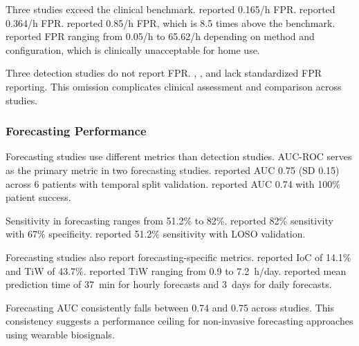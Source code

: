 Three studies exceed the clinical benchmark. \textcite{dongTwoLayerEnsembleMethod2022} reported 0.165/h FPR. \textcite{wangEpilepticSeizureDetection2025} reported 0.364/h FPR. \textcite{odeDevelopmentEpilepticSeizure2023} reported 0.85/h FPR, which is 8.5 times above the benchmark. \textcite{reintjesECGBasedDetectionEpileptic2025} reported FPR ranging from 0.05/h to 65.62/h depending on method and configuration, which is clinically unacceptable for home use.

Three detection studies do not report FPR. \textcite{singhrathoreDevelopmentMultimodalMachine2024}, \textcite{elemamAutomatedValidatedTool2025}, and \textcite{borujenyDetectionEpilepticSeizure2013} lack standardized FPR reporting. This omission complicates clinical assessment and comparison across studies.

\subsubsection{Forecasting Performance}

Forecasting studies use different metrics than detection studies. AUC-ROC serves as the primary metric in two forecasting studies. \textcite{nasseriAmbulatorySeizureForecasting2021} reported AUC 0.75 (SD 0.15) across 6 patients with temporal split validation. \textcite{stirlingForecastingSeizureLikelihood2021} reported AUC 0.74 with 100\% patient success.

Sensitivity in forecasting ranges from 51.2\% to 82\%. \textcite{vielufSeizureMonitoringCombined2025} reported 82\% sensitivity with 67\% specificity. \textcite{meiselMachineLearningWristband2020} reported 51.2\% sensitivity with LOSO validation.

Forecasting studies also report forecasting-specific metrics. \textcite{meiselMachineLearningWristband2020} reported IoC of 14.1\% and TiW of 43.7\%. \textcite{nasseriAmbulatorySeizureForecasting2021} reported TiW ranging from 0.9 to 7.2~h/day. \textcite{stirlingForecastingSeizureLikelihood2021} reported mean prediction time of 37~min for hourly forecasts and 3~days for daily forecasts.

Forecasting AUC consistently falls between 0.74 and 0.75 across studies. This consistency suggests a performance ceiling for non-invasive forecasting approaches using wearable biosignals.

